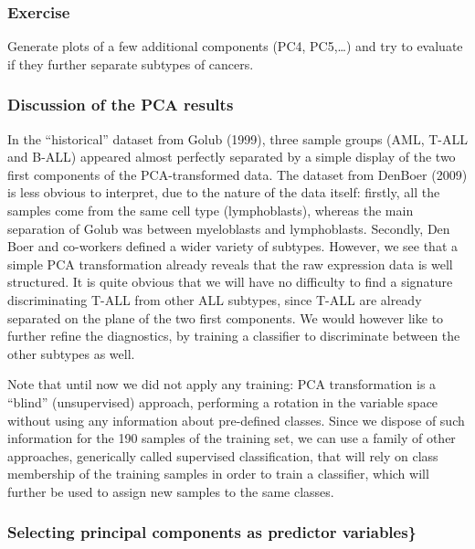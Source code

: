 \subsubsection{Exercise}\label{exercise}

Generate plots of a few additional components (PC4, PC5,\ldots{}) and
try to evaluate if they further separate subtypes of cancers.

\subsubsection{Discussion of the PCA
results}\label{discussion-of-the-pca-results}

In the ``historical'' dataset from Golub (1999), three sample groups
(AML, T-ALL and B-ALL) appeared almost perfectly separated by a simple
display of the two first components of the PCA-transformed data. The
dataset from DenBoer (2009) is less obvious to interpret, due to the
nature of the data itself: firstly, all the samples come from the same
cell type (lymphoblasts), whereas the main separation of Golub was
between myeloblasts and lymphoblasts. Secondly, Den Boer and co-workers
defined a wider variety of subtypes. However, we see that a simple PCA
transformation already reveals that the raw expression data is well
structured. It is quite obvious that we will have no difficulty to find
a signature discriminating T-ALL from other ALL subtypes, since T-ALL
are already separated on the plane of the two first components. We would
however like to further refine the diagnostics, by training a classifier
to discriminate between the other subtypes as well.

Note that until now we did not apply any training: PCA transformation is
a ``blind'' (unsupervised) approach, performing a rotation in the
variable space without using any information about pre-defined classes.
Since we dispose of such information for the 190 samples of the training
set, we can use a family of other approaches, generically called
{supervised classification}, that will rely on class membership of the
training samples in order to train a classifier, which will further be
used to assign new samples to the same classes.

\subsubsection{Selecting principal components as predictor
variables\}}\label{selecting-principal-components-as-predictor-variables}

